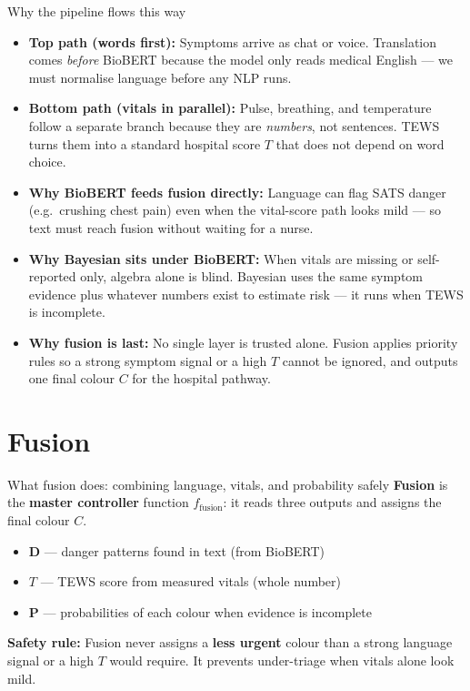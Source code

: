 \documentclass[aspectratio=169,11pt]{beamer}
\begin{document}
\begin{frame}{Why the pipeline flows this way}
	\footnotesize
	\setlength{\itemsep}{0.12em}
	\begin{itemize}
		\item \textbf{Top path (words first):} Symptoms arrive as chat or voice. Translation comes \textit{before} BioBERT because the model only reads medical English --- we must normalise language before any NLP runs.
		\item \textbf{Bottom path (vitals in parallel):} Pulse, breathing, and temperature follow a separate branch because they are \textit{numbers}, not sentences. TEWS turns them into a standard hospital score $T$ that does not depend on word choice.
		\item \textbf{Why BioBERT feeds fusion directly:} Language can flag SATS danger (e.g.\ crushing chest pain) even when the vital-score path looks mild --- so text must reach fusion without waiting for a nurse.
		\item \textbf{Why Bayesian sits under BioBERT:} When vitals are missing or self-reported only, algebra alone is blind. Bayesian uses the same symptom evidence plus whatever numbers exist to estimate risk --- it runs when TEWS is incomplete.
		\item \textbf{Why fusion is last:} No single layer is trusted alone. Fusion applies priority rules so a strong symptom signal or a high $T$ cannot be ignored, and outputs one final colour $C$ for the hospital pathway.
	\end{itemize}
\end{frame}

\section{Fusion}

\begin{frame}{What fusion does: combining language, vitals, and probability safely}
	\textbf{Fusion} is the \textbf{master controller} function $f_{\text{fusion}}$: it reads three outputs and assigns the final colour $C$.

	\vspace{0.35em}
	\begin{itemize}
		\item $\mathbf{D}$ --- danger patterns found in text (from BioBERT)
		\item $T$ --- TEWS score from measured vitals (whole number)
		\item $\mathbf{P}$ --- probabilities of each colour when evidence is incomplete
	\end{itemize}

	\vspace{0.3em}
	\textbf{Safety rule:} Fusion never assigns a \textbf{less urgent} colour than a strong language signal or a high $T$ would require. It prevents under-triage when vitals alone look mild.
\end{frame}
\end{document}
